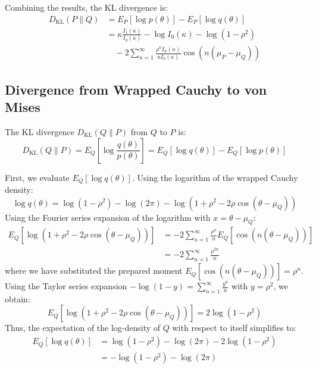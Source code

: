 \documentclass[11pt,a4paper]{article}
\begin{document}
Combining the results, the KL divergence is:
\begin{align}
D_{\text{KL}}(P \parallel Q) &= E_P[\log p(\theta)] - E_P[\log q(\theta)] \nonumber \\
&= \kappa \frac{I_1(\kappa)}{I_0(\kappa)} - \log I_0(\kappa) - \log(1 - \rho^2) \nonumber \\
&\quad - 2 \sum_{n=1}^\infty \frac{\rho^n I_n(\kappa)}{n I_0(\kappa)} \cos(n(\mu_P - \mu_Q))
\end{align}

\subsection{Divergence from Wrapped Cauchy to von Mises}
The KL divergence $D_{\text{KL}}(Q \parallel P)$ from $Q$ to $P$ is:
\begin{equation}
D_{\text{KL}}(Q \parallel P) = E_Q\left[ \log \frac{q(\theta)}{p(\theta)} \right] = E_Q[\log q(\theta)] - E_Q[\log p(\theta)]
\end{equation}

First, we evaluate $E_Q[\log q(\theta)]$. Using the logarithm of the wrapped Cauchy density:
\begin{equation}
\log q(\theta) = \log(1 - \rho^2) - \log(2\pi) - \log(1 + \rho^2 - 2\rho \cos(\theta - \mu_Q))
\end{equation}
Using the Fourier series expansion of the logarithm with $x = \theta - \mu_Q$:
\begin{align}
E_Q[\log(1 + \rho^2 - 2\rho \cos(\theta - \mu_Q))] &= -2 \sum_{n=1}^\infty \frac{\rho^n}{n} E_Q[\cos(n(\theta - \mu_Q))] \nonumber \\
&= -2 \sum_{n=1}^\infty \frac{\rho^{2n}}{n}
\end{align}
where we have substituted the prepared moment $E_Q[\cos(n(\theta - \mu_Q))] = \rho^n$. Using the Taylor series expansion $-\log(1 - y) = \sum_{n=1}^\infty \frac{y^n}{n}$ with $y = \rho^2$, we obtain:
\begin{equation}
E_Q[\log(1 + \rho^2 - 2\rho \cos(\theta - \mu_Q))] = 2 \log(1 - \rho^2)
\end{equation}
Thus, the expectation of the log-density of $Q$ with respect to itself simplifies to:
\begin{align}
E_Q[\log q(\theta)] &= \log(1 - \rho^2) - \log(2\pi) - 2 \log(1 - \rho^2) \nonumber \\
&= -\log(1 - \rho^2) - \log(2\pi)
\end{align}
\end{document}
